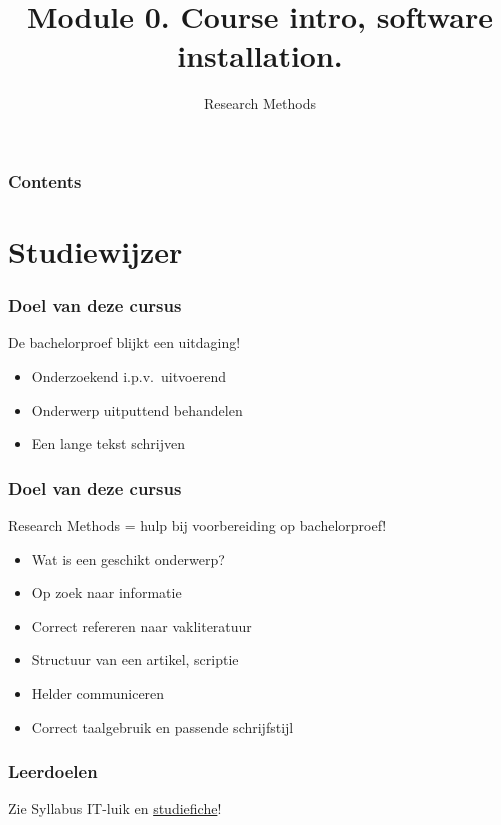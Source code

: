 \documentclass[aspectratio=169]{beamer}
\title{Module 0. Course intro, software installation.}
\subtitle{Research Methods}
\author{\lecturers}   %
\date{\academicyear}
\begin{document}
\begin{frame}
  \maketitle
\end{frame}

\begin{frame}
  \frametitle{Contents}

  \tableofcontents
\end{frame}

\section{Studiewijzer}

\begin{frame}
  \frametitle{Doel van deze cursus}

  De bachelorproef blijkt een uitdaging!

  \begin{itemize}
    \item Onderzoekend i.p.v.\ uitvoerend
    \item Onderwerp uitputtend behandelen
    \item Een lange tekst schrijven
  \end{itemize}

\end{frame}

\begin{frame}
  \frametitle{Doel van deze cursus}

  Research Methods = hulp bij voorbereiding op bachelorproef!

  \begin{itemize}
    \item Wat is een geschikt onderwerp?
    \item Op zoek naar informatie
    \item Correct refereren naar vakliteratuur
    \item Structuur van een artikel, scriptie
    \item Helder communiceren
    \item Correct taalgebruik en passende schrijfstijl
  \end{itemize}
\end{frame}

\begin{frame}
  \frametitle{Leerdoelen}

  Zie Syllabus IT-luik en \href{https://bamaflexweb.hogent.be/BMFUIDetailxOLOD.aspx?a=134982&b=5&c=1}{studiefiche}!
\end{frame}
\end{document}
